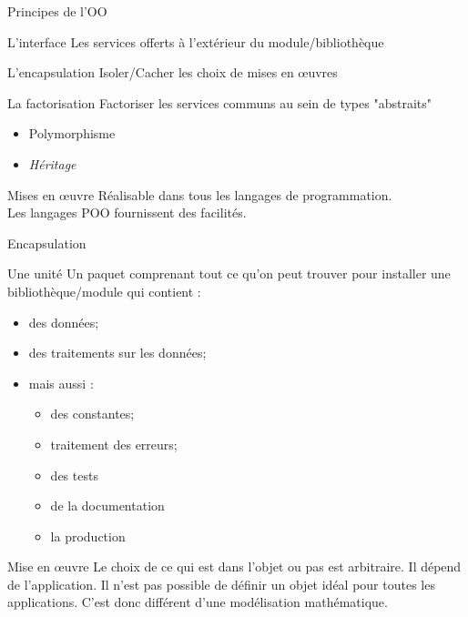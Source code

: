 \documentclass[handout,10pt]{beamer}
\begin{document}
\begin{frame}{Principes de l'OO}
\begin{block}{L'interface}
Les services offerts à l'extérieur du module/bibliothèque
\end{block}
\begin{block}{L'encapsulation}
Isoler/Cacher les choix de mises en {\oe}uvres
\end{block}
\begin{block}{La factorisation}
Factoriser les services communs au sein de types "abstraits"
\begin{itemize}
\item Polymorphisme
\item \textsl{Héritage}
\end{itemize}
\end{block}

\begin{alertblock}{Mises en {\oe}uvre}
Réalisable dans tous les langages de programmation.\\
Les langages POO fournissent des facilités.
\end{alertblock}
\end{frame}

\begin{frame}{Encapsulation}
\scriptsize
\begin{block}{Une unité}
Un paquet comprenant tout ce qu'on peut trouver pour installer une bibliothèque/module qui contient :
\begin{itemize}
\item des données;
\item des traitements sur les données;
\item mais aussi :
\begin{itemize}
\item des constantes;
\item traitement des erreurs;
\item des tests
\item de la documentation
\item la production
\end{itemize}
\end{itemize}
\end{block}

\begin{block}{Mise en {\oe}uvre}
Le choix de ce qui est dans l'objet ou pas est arbitraire. Il dépend de l'application. Il n'est pas possible de définir un objet idéal pour toutes les applications. C'est donc différent d'une modélisation mathématique.
\end{block}
\end{frame}
\end{document}
